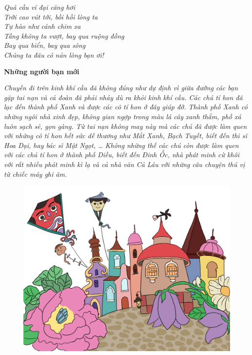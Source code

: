 	\begin{adjustwidth}{75pt}{0pt}
		\begin{flushleft}
			\textit{Quả cầu vĩ đại căng hơi\\
			Trời cao vút tới, bồi hồi lòng ta\\
			Tự hào như cánh chim xa\\
			Tầng không ta vượt, bay qua ruộng đồng\\
			Bay qua biển, bay qua sông\\
			Chúng ta đâu có nản lòng bạn ơi!}
		\end{flushleft}
	\end{adjustwidth}
	\begin{center}
		\textbf{\color{toancuabi}Những người bạn mới}
	\end{center}
	\textit{Chuyến đi trên kinh khí cầu đã không đúng như dự định vì giữa đường các bạn gặp tai nạn và cả đoàn đã phải nhảy dù ra khỏi kinh khí cầu. Các chú tí hon đã lạc đến thành phố Xanh và được các cô tí hon ở đây giúp đỡ. Thành phố Xanh có những ngôi nhà xinh đẹp, không gian ngợp trong màu lá cây xanh thắm, phố xá luôn sạch sẽ, gọn gàng. Từ tai nạn không may này mà các chú đã được làm quen với những cô tí hon hết sức dễ thương như Mắt Xanh, Bạch Tuyết, biết đến thi sĩ Hoa Dại, hay bác sĩ Mật Ngọt, …  Không những thế các chú còn được làm quen với các chú tí hon ở thành phố Diều, biết đến Đinh Ốc, nhà phát minh cừ khôi với rất nhiều phát minh kì lạ và cả nhà văn Cả Láu với những câu chuyện thú vị từ chiếc máy ghi âm.}
	\vskip 0.1cm

\begin{figure}[H]
		\centering
		\vspace*{-5pt}
		\captionsetup{labelformat= empty, justification=centering}
		\includegraphics[width=0.5\linewidth]{Hinh11_ThanhPhoDieu}
		\vspace*{-10pt}
	\end{figure}	
	
